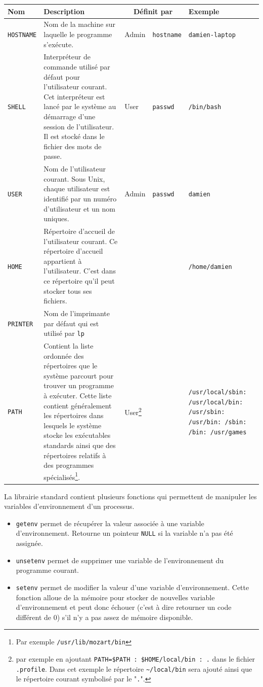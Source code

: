 \noindent\begin{tabularx}{\textwidth}{|p{}|p{}|p{}p{}|p{}|}
  \hline
  \textbf{Nom} & \textbf{Description} & \multicolumn{2}{c|}{\textbf{Définit par}} & \textbf{Exemple} \\
  \hline \hline
  \texttt{HOSTNAME} & Nom de la machine sur laquelle le programme s'exécute.
  & Admin & \texttt{hostname} & \texttt{damien-laptop}\\
  \hline
  \texttt{SHELL} & Interpréteur de commande utilisé par défaut pour l'utilisateur courant.
  Cet interpréteur est lancé par le système au démarrage d'une session de l'utilisateur.
  Il est stocké dans le fichier des mots de passe.
  & User & \texttt{passwd} & \texttt{/bin/bash} \\
  \hline
  \texttt{USER} & Nom de l'utilisateur courant.
  Sous Unix, chaque utilisateur est identifié par un numéro d'utilisateur et un nom uniques.
  & Admin & \texttt{passwd} & \texttt{damien} \\
  \hline
  \texttt{HOME} & Répertoire d'accueil de l'utilisateur courant.
  Ce répertoire d'accueil appartient à l'utilisateur.
  C'est dans ce répertoire qu'il peut stocker tous ses fichiers.
  & & & \texttt{/home/damien} \\
  \hline
  \texttt{PRINTER} & Nom de l'imprimante par défaut qui est utilisé par \texttt{lp} & & & \\
  \hline
  \texttt{PATH} & Contient la liste ordonnée des répertoires que le système parcourt pour trouver un programme à exécuter.
  Cette liste contient généralement les répertoires dans lesquels le système stocke les exécutables standards ainsi que des répertoires relatifs à des programmes spécialisés\footnote{Par exemple \texttt{/usr/lib/mozart/bin}}.
  & User\footnote{par exemple en ajoutant \texttt{PATH=\$PATH : \$HOME/local/bin : .} dans le fichier \texttt{.profile}.
Dans cet exemple le répertoire \texttt{\~{}/local/bin} sera ajouté ainsi que le répertoire courant symbolisé par le "\texttt{.}".} & & \texttt{/usr/local/sbin: /usr/local/bin: /usr/sbin: /usr/bin: /sbin: /bin: /usr/games}\\
  \hline
\end{tabularx}

La librairie standard contient plusieurs fonctions qui permettent de manipuler les variables d'environnement d'un processus.
\begin{itemize}
  \item \texttt{getenv} permet de récupérer la valeur associée à une variable d'environnement.
    Retourne un pointeur \texttt{NULL} si la variable n'a pas été assignée.
  \item \texttt{unsetenv} permet de supprimer une variable de l'environnement du programme courant.
  \item \texttt{setenv} permet de modifier la valeur d'une variable d'environnement.
    Cette fonction alloue de la mémoire pour stocker de nouvelles variable d'environnement et peut donc échouer (c'est à dire retourner un code différent de 0) s'il n'y a pas assez de mémoire disponible.
\end{itemize}

